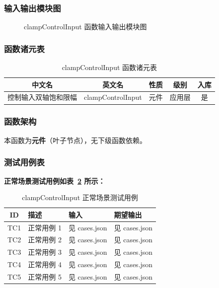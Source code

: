 \documentclass[a4paper,10pt]{article}
\begin{document}
\subsubsection{输入输出模块图}
\begin{figure}[h]
    \centering
    \caption{clampControlInput 函数输入输出模块图}
    \label{fig:io_clampControlInput}
\end{figure}
\subsubsection{函数诸元表}
\begin{table}[h]
    \centering
    \caption{clampControlInput 函数诸元表}
    \label{tab:meta_clampControlInput}
    \begin{tabular}{|c|c|c|c|c|}
        \hline
        中文名 & 英文名 & 性质 & 级别 & 入库 \\ \hline
        控制输入双轴饱和限幅 & clampControlInput & 元件 & 应用层 & 是 \\ \hline
    \end{tabular}
\end{table}
\subsubsection{函数架构}
\par 本函数为\textbf{元件}（叶子节点），无下级函数依赖。

\subsubsection{测试用例表}
\noindent\textbf{正常场景测试用例如表~\ref{tab:normal_clampControlInput} 所示：}
\begin{table}[h]
\centering
\caption{clampControlInput 正常场景测试用例}
\label{tab:normal_clampControlInput}
\begin{tabular}{|c|p{3.5cm}|p{3.5cm}|p{3.5cm}|}
\hline
ID & 描述 & 输入 & 期望输出 \\ \hline
  TC1 & 正常用例 1 & 见 cases.json & 见 cases.json \\ \hline
  TC2 & 正常用例 2 & 见 cases.json & 见 cases.json \\ \hline
  TC3 & 正常用例 3 & 见 cases.json & 见 cases.json \\ \hline
  TC4 & 正常用例 4 & 见 cases.json & 见 cases.json \\ \hline
  TC5 & 正常用例 5 & 见 cases.json & 见 cases.json \\ \hline
\end{tabular}
\end{table}
\end{document}

